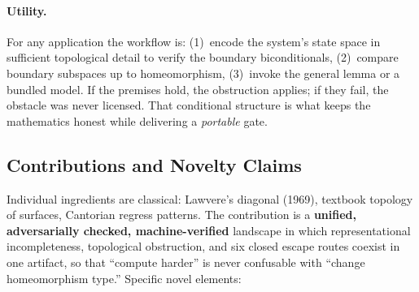 \documentclass[11pt]{article}
\begin{document}
\paragraph{Utility.}
For any application the workflow is:
(1)~encode the system's state space in sufficient topological detail to
verify the boundary biconditionals,
(2)~compare boundary subspaces up to homeomorphism,
(3)~invoke the general lemma or a bundled model.
If the premises hold, the obstruction applies; if they fail, the
obstacle was never licensed.  That conditional structure is what keeps
the mathematics honest while delivering a \emph{portable} gate.

\subsection{Contributions and Novelty Claims}

Individual ingredients are classical: Lawvere's diagonal (1969), textbook
topology of surfaces, Cantorian regress patterns.
The contribution is a \textbf{unified, adversarially checked, machine-verified}
landscape in which representational incompleteness, topological obstruction,
and six closed escape routes coexist in one artifact, so that ``compute
harder'' is never confusable with ``change homeomorphism type.''  Specific
novel elements:
\end{document}
